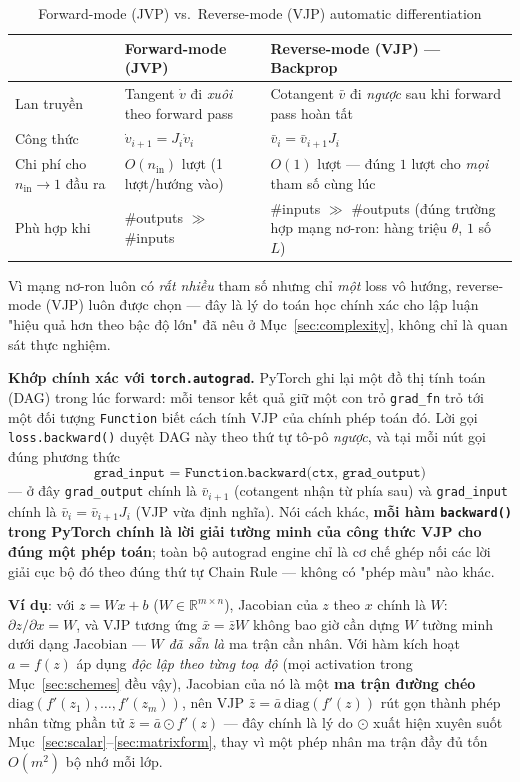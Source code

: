\documentclass[12pt,a4paper]{article}
\begin{document}
\begin{table}[H]
\centering
\small
\begin{tabular}{@{}p{2.6cm}p{5.5cm}p{6.1cm}@{}}
\toprule
 & \textbf{Forward-mode (JVP)} & \textbf{Reverse-mode (VJP) --- Backprop} \\
\midrule
Lan truyền & Tangent $\dot v$ đi \emph{xuôi} theo forward pass & Cotangent $\bar v$ đi \emph{ngược} sau khi forward pass hoàn tất \\
Công thức & $\dot v_{i+1} = J_i\dot v_i$ & $\bar v_i = \bar v_{i+1}J_i$ \\
Chi phí cho $n_{\text{in}}\to1$ đầu ra & $O(n_{\text{in}})$ lượt (1 lượt/hướng vào) & $O(1)$ lượt --- đúng $1$ lượt cho \emph{mọi} tham số cùng lúc \\
Phù hợp khi & \#outputs $\gg$ \#inputs & \#inputs $\gg$ \#outputs (đúng trường hợp mạng nơ-ron: hàng triệu $\theta$, $1$ số $L$) \\
\bottomrule
\end{tabular}
\caption{Forward-mode (JVP) vs.\ Reverse-mode (VJP) automatic differentiation}
\label{tab:vjp_jvp}
\end{table}

Vì mạng nơ-ron luôn có \emph{rất nhiều} tham số nhưng chỉ \emph{một} loss
vô hướng, reverse-mode (VJP) luôn được chọn --- đây là lý do toán học
chính xác cho lập luận "hiệu quả hơn theo bậc độ lớn" đã nêu ở
Mục~\ref{sec:complexity}, không chỉ là quan sát thực nghiệm.

\textbf{Khớp chính xác với \texttt{torch.autograd}.} PyTorch ghi lại một
đồ thị tính toán (DAG) trong lúc forward: mỗi tensor kết quả giữ một con
trỏ \texttt{grad\_fn} trỏ tới một đối tượng \texttt{Function} biết cách
tính VJP của chính phép toán đó. Lời gọi \texttt{loss.backward()} duyệt
DAG này theo thứ tự tô-pô \emph{ngược}, và tại mỗi nút gọi đúng phương
thức
$$\texttt{grad\_input = Function.backward(ctx, grad\_output)}$$
--- ở đây \texttt{grad\_output} chính là $\bar v_{i+1}$ (cotangent nhận từ
phía sau) và \texttt{grad\_input} chính là $\bar v_i=\bar v_{i+1}J_i$ (VJP
vừa định nghĩa). Nói cách khác, \textbf{mỗi hàm \texttt{backward()} trong
PyTorch chính là lời giải tường minh của công thức VJP cho đúng một phép
toán}; toàn bộ autograd engine chỉ là cơ chế ghép nối các lời giải cục bộ
đó theo đúng thứ tự Chain Rule --- không có "phép màu" nào khác.

\textbf{Ví dụ}: với $z=Wx+b$ ($W\in\mathbb R^{m\times n}$), Jacobian của
$z$ theo $x$ chính là $W$: $\partial z/\partial x = W$, và VJP tương ứng
$\bar x=\bar zW$ không bao giờ cần dựng $W$ tường minh dưới dạng Jacobian
--- $W$ \emph{đã sẵn là} ma trận cần nhân. Với hàm kích hoạt $a=f(z)$ áp
dụng \emph{độc lập theo từng toạ độ} (mọi activation trong
Mục~\ref{sec:schemes} đều vậy), Jacobian của nó là một \textbf{ma trận
đường chéo} $\mathrm{diag}(f'(z_1),\ldots,f'(z_m))$, nên VJP
$\bar z=\bar a\,\mathrm{diag}(f'(z))$ rút gọn thành phép nhân từng phần tử
$\bar z=\bar a\odot f'(z)$ --- đây chính là lý do $\odot$ xuất hiện xuyên
suốt Mục~\ref{sec:scalar}--\ref{sec:matrixform}, thay vì một phép nhân ma
trận đầy đủ tốn $O(m^2)$ bộ nhớ mỗi lớp.
\end{document}
